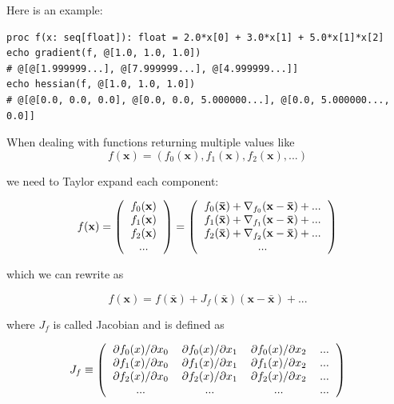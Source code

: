 \documentclass[justified, sixbynine]{tufte-book}
\theoremstyle{plain}%
\newtheorem * {corollary}{Corollary}
\theoremstyle{definition}
\theoremstyle{remark}
\newtheorem * {remark}{Remark}
\newtheorem * {note}{Note}
\begin{document}
\begin{fullwidth}
Here is an example:

\begin{lstlisting}
proc f(x: seq[float]): float = 2.0*x[0] + 3.0*x[1] + 5.0*x[1]*x[2]
echo gradient(f, @[1.0, 1.0, 1.0])
# @[@[1.999999...], @[7.999999...], @[4.999999...]]
echo hessian(f, @[1.0, 1.0, 1.0])
# @[@[0.0, 0.0, 0.0], @[0.0, 0.0, 5.000000...], @[0.0, 5.000000..., 0.0]]
\end{lstlisting}

When dealing with functions returning multiple values like
\begin{equation}
f(\mathbf{x}) = (f_0(\mathbf{x}), f_1(\mathbf{x}), f_2(\mathbf{x}), ...)
\end{equation}

we need to Taylor expand each component:

\begin{equation}
f(\mathbf{x}) =
\left(
\begin{tabular}{c}
$f_0(\mathbf{x})$ \\
$f_1(\mathbf{x})$ \\
$f_2(\mathbf{x})$ \\
...
\end{tabular}
\right) =
\left(
\begin{tabular}{c}
$f_0(\mathbf{\bar x}) + \nabla_{f_0}(\mathbf{x}-\mathbf{\bar x}) + ...$ \\
$f_1(\mathbf{\bar x}) + \nabla_{f_1}(\mathbf{x}-\mathbf{\bar x}) + ...$ \\
$f_2(\mathbf{\bar x}) + \nabla_{f_2}(\mathbf{x}-\mathbf{\bar x}) + ...$ \\
...
\end{tabular}
\right)
\end{equation}

which we can rewrite as

\begin{equation}
f(\mathbf{x}) = f(\mathbf{\bar x}) + J_f(\mathbf{\bar x})(\mathbf{x}-\mathbf{\bar x}) + ... \label{jacobian2}
\end{equation}

where $J_f$ is called Jacobian and is defined as

\begin{equation}
J_f \equiv
\left(
\begin{tabular}{cccc}
$\partial f_0(x)/\partial x_0$ &
$\partial f_0(x)/\partial x_1$ &
$\partial f_0(x)/\partial x_2$ &
... \\
$\partial f_1(x)/\partial x_0$ &
$\partial f_1(x)/\partial x_1$ &
$\partial f_1(x)/\partial x_2$ &
... \\
$\partial f_2(x)/\partial x_0$ &
$\partial f_2(x)/\partial x_1$ &
$\partial f_2(x)/\partial x_2$ &
... \\
... & ... & ... & ...
\end{tabular}
\right)
\end{equation}


\end{fullwidth}
\end{document}
